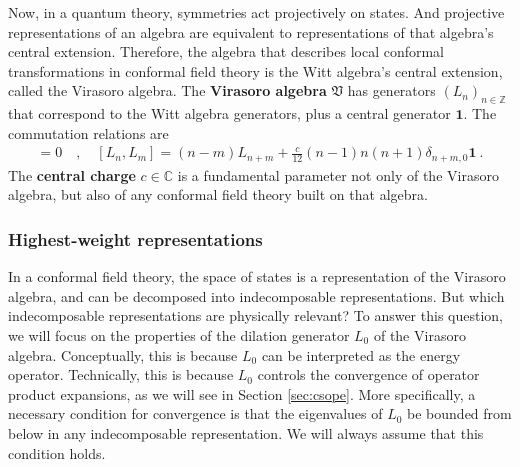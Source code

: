\documentclass[12pt, a4paper]{article}
\newcommand{\myindex}[1]{\textbf{\boldmath #1}}
\theoremstyle{break}
\begin{document}
Now, in a quantum theory, symmetries act projectively on states. And projective representations of an algebra are equivalent to representations of that algebra's central extension. 
Therefore, the algebra that describes local conformal transformations in conformal field theory is the Witt algebra's central extension, called the Virasoro algebra. The \myindex{Virasoro algebra} $\mathfrak{V}$ has generators $(L_n)_{n\in\mathbb{Z}}$ that correspond to the Witt algebra generators, plus a central generator $\mathbf 1$. The commutation relations are 
 \begin{align}
  [\mathbf 1, L_n] = 0 \quad , \quad \boxed{[L_n,L_m] = (n-m)L_{n+m} +\frac{c}{12}(n-1)n(n+1)\delta_{n+m,0}\mathbf 1} \ .
  \label{vir}
 \end{align}
 The \myindex{central charge} $c\in\mathbb{C}$ is a fundamental parameter not only of the Virasoro algebra, but also of any conformal field theory built on that algebra. 

\subsubsection{Highest-weight representations}\label{sec:hwr}

In a conformal field theory, the space of states is a representation of the Virasoro algebra, and can be decomposed into indecomposable representations. But which indecomposable representations are physically relevant? To answer this question, we will focus on the properties of the dilation generator $L_0$ of the Virasoro algebra. Conceptually, this is because $L_0$ can be interpreted as the energy operator. Technically, this is because $L_0$ controls the convergence of operator product expansions, as we will see in Section \ref{sec:csope}. More specifically, a necessary condition for convergence is that the eigenvalues of $L_0$ be bounded from below in any indecomposable representation. We will always assume that this condition holds.
\end{document}
